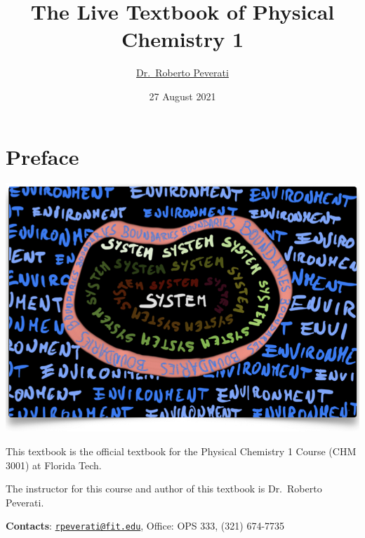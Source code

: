 \documentclass[
  9pt,
]{extbook}
\title{The Live Textbook of Physical Chemistry 1}
\author{\href{mailto:rpeverati@fit.edu}{Dr.~Roberto Peverati}}
\date{27 August 2021}
\let\oldmaketitle\maketitle
\theoremstyle{definition}
\theoremstyle{definition}
\theoremstyle{definition}
\theoremstyle{remark}
\begin{document}
\maketitle


%
\newpage

\let\maketitle\oldmaketitle

\renewcommand\thepage{\romannumeral\numexpr\value{page}-1\relax}


{
\setcounter{tocdepth}{1}
\tableofcontents
}
\renewcommand{\arraystretch}{1.8}

\hypertarget{preface}{%
\chapter*{Preface}\label{preface}}

\begin{center}\includegraphics[width=0.8\linewidth]{./img/OEP_Figures.000} \end{center}

This textbook is the official textbook for the Physical Chemistry 1 Course (CHM 3001) at Florida Tech.

The instructor for this course and author of this textbook is Dr.~Roberto Peverati.

\textbf{Contacts}: \href{mailto:rpeverati@fit.edu}{\nolinkurl{rpeverati@fit.edu}}, Office: OPS 333, (321) 674-7735
\end{document}
